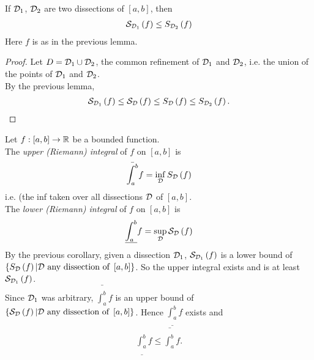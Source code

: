 \documentclass[a4paper]{article}
\begin{document}
\begin{coro}
If $\mathcal{D}_1$, $\mathcal{D}_2$ are two dissections of $\left[a,b\right]$, then
\begin{equation*}
\begin{aligned}
\mathcal{S}_{\mathcal{D}_1}\left(f\right) \leq S_{\mathcal{D}_2} \left(f\right)
\end{aligned}
\end{equation*}
Here $f$ is as in the previous lemma.
\begin{proof}
Let $D=\mathcal{D}_1 \cup \mathcal{D}_2$, the common refinement of $\mathcal{D}_1$ and $\mathcal{D}_2$, i.e. the union of the points of $\mathcal{D}_1$ and $\mathcal{D}_2$.\\
By the previous lemma,
\begin{equation*}
\begin{aligned}
\mathcal{S}_{\mathcal{D}_1}\left(f\right) \leq \mathcal{S}_{\mathcal{D}}\left(f\right) \leq S_{\mathcal{D}}\left(f\right) \leq S_{\mathcal{D}_2}\left(f\right).
\end{aligned}
\end{equation*}
\end{proof}
\end{coro}

\begin{defi}
Let $f:\left[a,b\right]\to \mathbb{R}$ be a bounded function.\\
The \emph{upper (Riemann) integral} of $f$ on $\left[a,b\right]$ is
\begin{equation*}
\begin{aligned}
\bar{\int_a^b} f = \inf_{\mathcal{D}} S_{\mathcal{D}} \left(f\right)
\end{aligned}
\end{equation*}
i.e. (the inf taken over all dissections $\mathcal{D}$ of $\left[a,b\right]$.\\
The \emph{lower (Riemann) integral} of $f$ on $\left[a,b\right]$ is
\begin{equation*}
\begin{aligned}
\underline{\int_a^b} f = \sup_{\mathcal{D}} \mathcal{S}_{\mathcal{D}}\left(f\right)
\end{aligned}
\end{equation*}
By the previous corollary, given a dissection $\mathcal{D}_1$, $\mathcal{S}_{\mathcal{D}_1} \left(f\right)$ is a lower bound of $\left\{S_{\mathcal{D}} \left(f\right)|\mathcal{D} \text{  any dissection of  }\left[a,b\right]\right\}$. So the upper integral exists and is at least $\mathcal{S}_{\mathcal{D}_1}\left(f\right)$.\\
Since $\mathcal{D}_1$ was arbitrary, $\bar{\int_a^b} f$ is an upper bound of $\left\{\mathcal{S}_{\mathcal{D}} \left(f\right)|\mathcal{D} \text{  any dissection of  }\left[a,b\right]\right\}$. Hence $\underline{\int_a^b} f$ exists and
\begin{equation*}
\begin{aligned}
\underline{\int_a^b} f \leq \bar{\int_a^b} f.
\end{aligned}
\end{equation*}
\end{defi}
\end{document}
